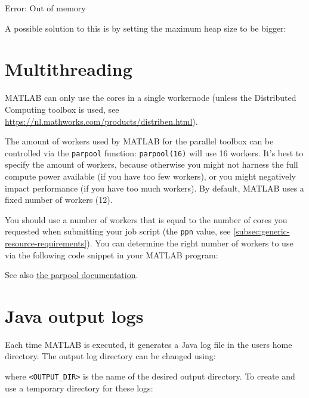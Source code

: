 \begin{prompt}
Error: Out of memory
\end{prompt}

A possible solution to this is by setting the maximum heap size to be bigger:

\begin{prompt}
\end{prompt}

\section{Multithreading}

MATLAB can only use the cores in a single
workernode (unless the Distributed Computing toolbox is used, see
\url{https://nl.mathworks.com/products/distriben.html}).


The amount of workers used by MATLAB for the parallel toolbox can be controlled
via the \lstinline|parpool| function: \lstinline|parpool(16)| will use 16 workers.
It's best to specify the amount of workers,
because otherwise you might not harness the full compute power available (if you have
too few workers), or you might negatively impact performance (if you have too much workers).
By default, MATLAB uses a fixed number of workers (12).

You should use a number of workers that is equal to the number of cores you requested
when submitting your job script (the \lstinline|ppn| value, see \autoref{subsec:generic-resource-requirements}).
You can determine the right number of workers to use via the following code snippet in your MATLAB program:



See also \href{https://nl.mathworks.com/help/distcomp/parpool.html}{the parpool documentation}.


\section{Java output logs}

Each time MATLAB is executed, it generates a Java log file in the users home directory.
The output log directory can be changed using:

\begin{prompt}
\end{prompt}

where \lstinline|<OUTPUT_DIR>| is the name of the desired output directory. To create
and use a temporary directory for these logs:

